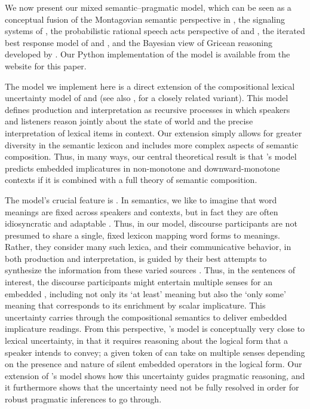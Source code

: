 \documentclass[leqno,12pt]{article}
\begin{document}
We now present our mixed semantic--pragmatic model, which can be seen
as a conceptual fusion of the Montagovian semantic perspective in
\citet{Lewis70GS}, the signaling systems of \citet{Lewis69}, the
probabilistic rational speech acts perspective of
\citet{Frank:Goodman:2012} and \citet{Goodman:Stuhlmuller:2013}, the
iterated best response model of \citet{Jaeger:2007,Jaeger:2011} and
\citet{Franke09DISS}, and the Bayesian view of Gricean reasoning
developed by \citet{Russell:2012}.  Our Python implementation of the
model is available from the website for this paper.

The model we implement here is a direct extension of the compositional
lexical uncertainty model of \citet{Bergen:Goodman:Levy:2012} and
\citet{Bergen:Levy:Goodman:2014} (see also
\citealp{lassiter-goodman:2013SALT,lassitergoodman15}, for a closely related
variant). This model defines production and
interpretation as recursive processes in which speakers and listeners
reason jointly about the state of world and the precise interpretation
of lexical items in context.  Our extension simply allows for greater
diversity in the semantic lexicon and includes more complex aspects of
semantic composition. Thus, in many ways, our central theoretical
result is that \citeauthor{Bergen:Levy:Goodman:2014}'s model predicts
embedded implicatures in non-monotone and downward-monotone contexts
if it is combined with a full theory of semantic composition.


The model's crucial feature is .  In
semantics, we like to imagine that word meanings are fixed across
speakers and contexts, but in fact they are often idiosyncratic
and adaptable \citep{clark-clark79,Clark97}. Thus, in our model, discourse
participants are not presumed to share a single, fixed
lexicon mapping word forms to meanings. Rather, they consider many such lexica, and their communicative
behavior, in both production and interpretation, is guided by their
best attempts to synthesize the information from these varied sources
\citep{Giles:Coupland:Coupland:1991}. Thus, in the sentences of
interest, the discourse participants might entertain multiple senses
for an embedded , including not only its `at least' meaning
but also the `only some' meaning that corresponds to its enrichment by
scalar implicature. This uncertainty carries through the compositional
semantics to deliver embedded implicature readings. From this
perspective, \citeauthor{ChierchiaFoxSpector08}'s model is
conceptually very close to lexical uncertainty, in that it requires
reasoning about the logical form that a speaker intends to convey; a
given token of  can take on multiple senses depending on
the presence and nature of silent embedded operators in the logical
form. Our extension of \citeauthor{Bergen:Levy:Goodman:2014}'s model
shows how this uncertainty guides pragmatic reasoning, and it
furthermore shows that the uncertainty need not be fully resolved in
order for robust pragmatic inferences to go through.
\end{document}
